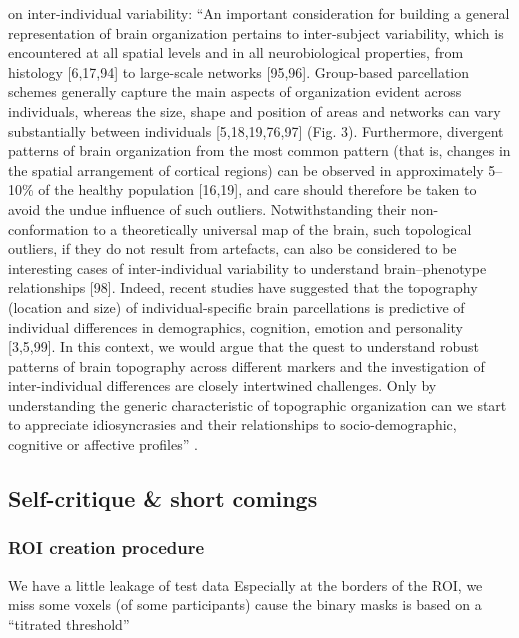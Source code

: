 \citet{eickhoff2018imaging} on inter-individual variability: ``An important
consideration for building a general representation of brain organization
pertains to inter-subject variability, which is encountered at all spatial
levels and in all neurobiological properties, from histology [6,17,94] to
large-scale networks [95,96]. Group-based parcellation schemes generally capture
the main aspects of organization evident across individuals, whereas the size,
shape and position of areas and networks can vary substantially between
individuals [5,18,19,76,97] (Fig. 3). Furthermore, divergent patterns of brain
organization from the most common pattern (that is, changes in the spatial
arrangement of cortical regions) can be observed in approximately 5–10\% of the
healthy population [16,19], and care should therefore be taken to avoid the
undue influence of such outliers. Notwithstanding their non-conformation to a
theoretically universal map of the brain, such topological outliers, if they do
not result from artefacts, can also be considered to be interesting cases of
inter-individual variability to understand brain–phenotype relationships [98].
Indeed, recent studies have suggested that the topography (location and size) of
individual-specific brain parcellations is predictive of individual differences
in demographics, cognition, emotion and personality [3,5,99]. In this context,
we would argue that the quest to understand robust patterns of brain topography
across different markers and the investigation of inter-individual differences
are closely intertwined challenges. Only by understanding the generic
characteristic of topographic organization can we start to appreciate
idiosyncrasies and their relationships to socio-demographic, cognitive or
affective profiles'' \citep{eickhoff2018imaging}.




\subsection{Self-critique \& short comings}


\subsubsection{ROI creation procedure}

We have a little leakage of test data
%
Especially at the borders of the ROI, we miss some voxels (of some participants)
cause the binary masks is based on a ``titrated threshold''
\citep{sengupta2016extension}

